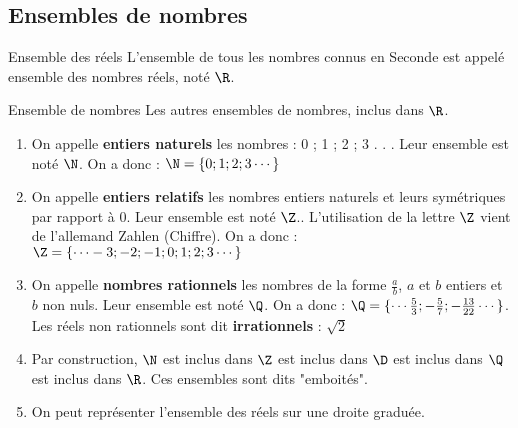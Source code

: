 \begin{pageCours}

\section{Ensembles de nombres}

\begin{DefT}{Ensemble des réels}
L'ensemble de tous les nombres connus en Seconde est appelé ensemble des nombres réels, noté $\R$.
\end{DefT}

\begin{DefT}{Ensemble de nombres}
Les autres ensembles de nombres, inclus dans $\R$.
\begin{enumerate}
\item On appelle \textbf{entiers naturels} les nombres : 0 ; 1 ; 2 ; 3 . . . Leur ensemble est noté $\N$.
On a donc : $\N =  \lbrace 0 ; 1 ; 2 ; 3 \cdots \rbrace $
\item  On appelle \textbf{entiers relatifs} les nombres entiers naturels et leurs symétriques par rapport à 0. Leur ensemble est noté $\Z$.. L'utilisation de la lettre $\Z$ vient de l'allemand Zahlen (Chiffre).
On a donc : $\Z = \lbrace \cdots -3 ; -2 ; -1 ; 0 ; 1 ; 2 ; 3  \cdots  \rbrace$
\item  On appelle \textbf{nombres rationnels} les nombres de la forme $\frac{a}{b}$, $a$ et $b$ entiers et $b$ non nuls.  Leur ensemble est noté $\Q$. 
On a donc : $\Q = \lbrace \cdots \frac{5}{3} ; -\frac{5}{7} ; -\frac{13}{22} \cdots   \rbrace$. Les réels non rationnels sont dit \textbf{irrationnels} : $\sqrt{2}$
\item Par construction, $\N$ est inclus dans $\Z$  est inclus dans $\D$  est inclus dans $\Q$  est inclus dans $\R$. Ces ensembles sont dits "emboités".
\item  On peut représenter l'ensemble des réels sur une droite graduée.
\begin{center}
 \end{center} 
\end{enumerate}
\end{DefT}



\end{pageCours}
